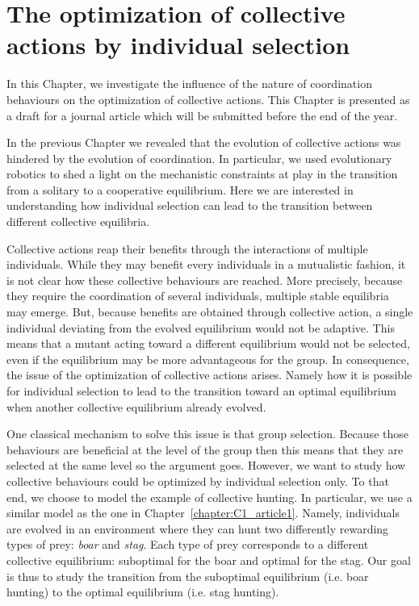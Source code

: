 \chapter{The optimization of collective actions by individual selection}
\label{chapter:C1_article2}

\setcounter{secnumdepth}{0}
\setcounter{minitocdepth}{1}
\minitoc[n] %

In this Chapter, we investigate the influence of the nature of coordination behaviours on the optimization of collective actions. This Chapter is presented as a draft for a journal article which will be submitted before the end of the year.

In the previous Chapter we revealed that the evolution of collective actions was hindered by the evolution of coordination. In particular, we used evolutionary robotics to shed a light on the mechanistic constraints at play in the transition from a solitary to a cooperative equilibrium. Here we are interested in understanding how individual selection can lead to the transition between different collective equilibria.

Collective actions reap their benefits through the interactions of multiple individuals. While they may benefit every individuals in a mutualistic fashion, it is not clear how these collective behaviours are reached. More precisely, because they require the coordination of several individuals, multiple stable equilibria may emerge. But, because benefits are obtained through collective action, a single individual deviating from the evolved equilibrium would not be adaptive. This means that a mutant acting toward a different equilibrium would not be selected, even if the equilibrium may be more advantageous for the group. In consequence, the issue of the optimization of collective actions arises. Namely how it is possible for individual selection to lead to the transition toward an optimal equilibrium when another collective equilibrium already evolved.

One classical mechanism to solve this issue is that group selection. Because those behaviours are beneficial at the level of the group then this means that they are selected at the same level so the argument goes. However, we want to study how collective behaviours could be optimized by individual selection only. To that end, we choose to model the example of collective hunting. In particular, we use a similar model as the one in Chapter~\ref{chapter:C1_article1}. Namely, individuals are evolved in an environment where they can hunt two differently rewarding types of prey: \emph{boar} and \emph{stag}. Each type of prey corresponds to a different collective equilibrium: suboptimal for the boar and optimal for the stag. Our goal is thus to study the transition from the suboptimal equilibrium (i.e. boar hunting) to the optimal equilibrium (i.e. stag hunting).

